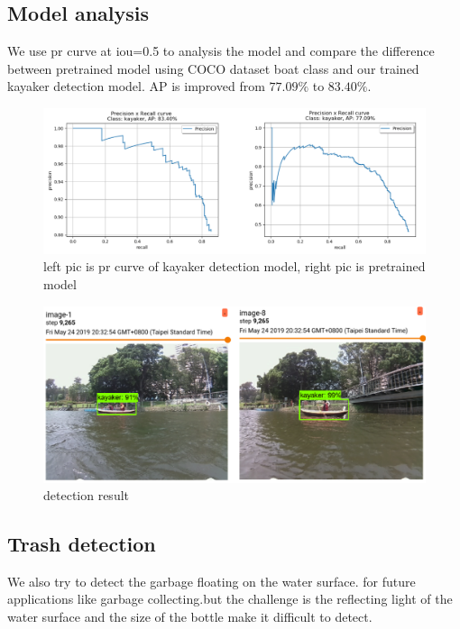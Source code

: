 \subsection{Model analysis}

We use pr curve at iou=0.5 to analysis the model and compare the difference between pretrained model using COCO dataset boat class and our trained kayaker detection model. AP is improved from $77.09\%$ to $83.40\%$. 

\begin{figure}[ht]
    \includegraphics[width=1\columnwidth]{images/kayaker_pr.png}
    \centering
    \caption{left pic is pr curve of kayaker detection model, right pic is pretrained model}
    \label{figure:kayaker_pr}
\end{figure}
\begin{figure}[ht]
    \includegraphics[width=1\columnwidth]{images/kayaker_dt.png}
    \centering
    \caption{detection result}
    \label{figure:kayaker_dt}
\end{figure}

\subsection{Trash detection}

We also try to detect the garbage floating on the water surface. for future applications like garbage collecting.but the challenge is the reflecting light of the water surface and the size of the bottle make it difficult to detect.

